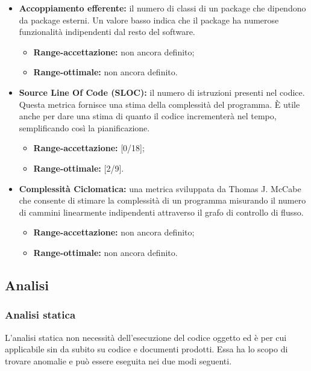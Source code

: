 \begin{itemize}
			\item \textbf{Accoppiamento efferente: }il numero di classi di un package che dipendono da package esterni. Un valore basso indica che il package ha numerose funzionalità indipendenti dal resto del software.
			
			\begin{itemize}
				\item \textbf{Range-accettazione: }non ancora definito;
				\item \textbf{Range-ottimale: }non ancora definito.
			\end{itemize}
			
			\item \textbf{Source Line Of Code (SLOC): }il numero di istruzioni presenti nel codice. Questa metrica fornisce una stima della complessità del programma. È utile anche per dare una stima di quanto il codice incrementerà nel tempo, semplificando così la pianificazione.
			
			\begin{itemize}
				\item \textbf{Range-accettazione: }[0/18];
				\item \textbf{Range-ottimale: }[2/9].
			\end{itemize}
			
			\item \textbf{Complessità Ciclomatica: }una metrica sviluppata da Thomas J. McCabe che consente di stimare la complessità di un programma misurando il numero di cammini linearmente indipendenti attraverso il grafo di controllo di flusso.
			
			\begin{itemize}
				\item \textbf{Range-accettazione: }non ancora definito;
				\item \textbf{Range-ottimale: }non ancora definito.
			\end{itemize}
			
			
		
		\end{itemize}
		
		
	\subsection{Analisi}
	
		\subsubsection{Analisi statica}
		L'analisi statica non necessità dell'esecuzione del codice oggetto ed è per cui applicabile sin da subito su codice e documenti prodotti. Essa ha lo scopo di trovare anomalie e può essere eseguita nei due modi seguenti.
		
